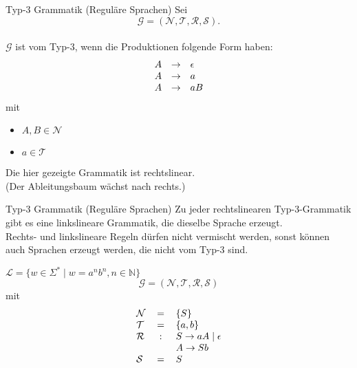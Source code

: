 \documentclass[]{beamer}
\begin{document}
\begin{frame}[<+->][squeeze]{}
  \begin{block}{Typ-3 Grammatik (Reguläre Sprachen)}
    Sei 
    \[\mathcal{G = (N, T, R, S)}.\] \\
    $\mathcal{G}$ ist vom Typ-3, wenn die Produktionen folgende Form haben:
    \[\begin{array}{l c l}
        A & \rightarrow & \epsilon \\
        A & \rightarrow & a \\
        A & \rightarrow & aB \\
      \end{array}\]
    mit
    \begin{itemize}
      \item<1-> $A, B \in \mathcal{N}$
      \item<1-> $a \in \mathcal{T}$
    \end{itemize}
    Die hier gezeigte Grammatik ist rechtslinear. \\
    (Der Ableitungsbaum wächst nach rechts.)
  \end{block}
\end{frame}

\begin{frame}[<+->][squeeze]{}
  \begin{block}{Typ-3 Grammatik (Reguläre Sprachen)}
    Zu jeder rechtslinearen Typ-3-Grammatik gibt es eine linkslineare Grammatik, die dieselbe Sprache erzeugt. \\
    Rechts- und linkslineare Regeln dürfen nicht vermischt werden, sonst können auch Sprachen erzeugt werden, die nicht vom Typ-3 sind.
  \end{block}
  
  \begin{exampleblock}{$\mathcal{L} = \{w \in \Sigma^* \;|\; w = a^nb^n, n \in \mathbb{N}\}$}
    \[\mathcal{G = (N, T, R, S)}\]
    mit
    \[\begin{tabular}{l c l}
      $\mathcal{N}$ & = & $\{S\}$ \\
      $\mathcal{T}$ & = & $\{a, b\}$ \\
      $\mathcal{R}$ & : & $S \rightarrow aA \;|\; \epsilon$ \\
                    &   & $A \rightarrow Sb$ \\
      $\mathcal{S}$ & = & $S$ \\
      \end{tabular}\]
  \end{exampleblock}
\end{frame}
\end{document}
